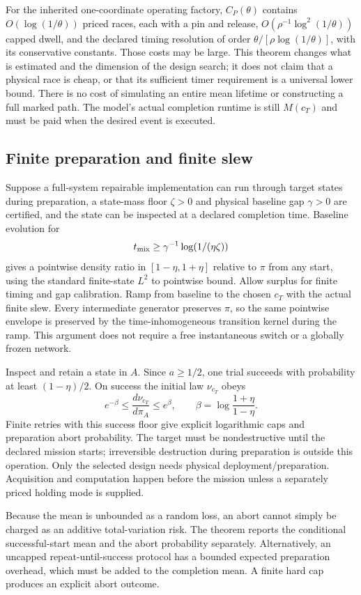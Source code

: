 \documentclass[11pt]{article}
\begin{document}
For the inherited one-coordinate operating factory, $C_P(\theta)$
contains $O(\log(1/\theta))$ priced races, each with a pin and release,
$O(\rho^{-1}\log^2(1/\theta))$ capped dwell, and the declared timing
resolution of order $\theta/[\rho\log(1/\theta)]$, with its conservative
constants. Those costs may be large. This theorem changes what is
estimated and the dimension of the design search; it does not claim
that a physical race is cheap, or that its sufficient timer requirement
is a universal lower bound. There is no cost of simulating an entire
mean lifetime or constructing a full marked path. The model's actual
completion runtime is still $M(c_T)$ and must be paid when the desired
event is executed.

\subsection{Finite preparation and finite slew}
Suppose a full-system repairable implementation can run through target
states during preparation, a state-mass floor $\zeta>0$ and physical
baseline gap $\gamma>0$ are certified, and the state can be inspected at
a declared completion time. Baseline evolution for
\[
 t_{\rm mix}\ge\gamma^{-1}\log(1/(\eta\zeta))
\]
gives a pointwise density ratio in $[1-\eta,1+\eta]$ relative to $\pi$
from any start, using the standard finite-state $L^2$ to pointwise bound.
Allow surplus for finite timing and gap calibration. Ramp from baseline
to the chosen $c_T$ with the actual finite slew. Every intermediate
generator preserves $\pi$, so the same pointwise envelope is preserved
by the time-inhomogeneous transition kernel during the ramp. This
argument does not require a free instantaneous switch or a globally
frozen network.

Inspect and retain a state in $A$. Since $a\ge1/2$, one trial succeeds
with probability at least $(1-\eta)/2$. On success the initial law
$\nu_{c_T}$ obeys
\[
 e^{-\beta}\le\frac{d\nu_{c_T}}{d\pi_A}\le e^\beta,
 \qquad \beta=\log\frac{1+\eta}{1-\eta}.
\]
Finite retries with this success floor give explicit logarithmic caps
and preparation abort probability. The target must be nondestructive
until the declared mission starts; irreversible destruction during
preparation is outside this operation. Only the selected design needs
physical deployment/preparation. Acquisition and computation happen
before the mission unless a separately priced holding mode is supplied.

Because the mean is unbounded as a random loss, an abort cannot simply
be charged as an additive total-variation risk. The theorem reports the
conditional successful-start mean and the abort probability separately.
Alternatively, an uncapped repeat-until-success protocol has a bounded
expected preparation overhead, which must be added to the completion
mean. A finite hard cap produces an explicit abort outcome.
\end{document}
